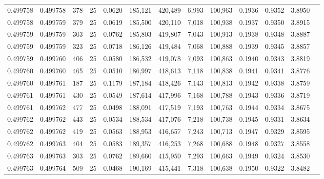 \begin{tabular}{rrrrrrrrrrrrr}
0.499758 & 0.499758 &   378 &  25 &                                     0.0620 & 185,121 & 420,489 &   6,993 & 100,963 & 0.1936 & 0.9352 & 3.8950 \\
0.499758 & 0.499759 &   379 &  25 &                                     0.0619 & 185,500 & 420,110 &   7,018 & 100,938 & 0.1937 & 0.9350 & 3.8915 \\
0.499759 & 0.499759 &   303 &  25 &                                     0.0762 & 185,803 & 419,807 &   7,043 & 100,913 & 0.1938 & 0.9348 & 3.8887 \\
0.499759 & 0.499759 &   323 &  25 &                                     0.0718 & 186,126 & 419,484 &   7,068 & 100,888 & 0.1939 & 0.9345 & 3.8857 \\
0.499759 & 0.499760 &   406 &  25 &                                     0.0580 & 186,532 & 419,078 &   7,093 & 100,863 & 0.1940 & 0.9343 & 3.8819 \\
0.499760 & 0.499760 &   465 &  25 &                                     0.0510 & 186,997 & 418,613 &   7,118 & 100,838 & 0.1941 & 0.9341 & 3.8776 \\
0.499760 & 0.499761 &   187 &  25 &                                     0.1179 & 187,184 & 418,426 &   7,143 & 100,813 & 0.1942 & 0.9338 & 3.8759 \\
0.499761 & 0.499761 &   430 &  25 &                                     0.0549 & 187,614 & 417,996 &   7,168 & 100,788 & 0.1943 & 0.9336 & 3.8719 \\
0.499761 & 0.499762 &   477 &  25 &                                     0.0498 & 188,091 & 417,519 &   7,193 & 100,763 & 0.1944 & 0.9334 & 3.8675 \\
0.499762 & 0.499762 &   443 &  25 &                                     0.0534 & 188,534 & 417,076 &   7,218 & 100,738 & 0.1945 & 0.9331 & 3.8634 \\
0.499762 & 0.499762 &   419 &  25 &                                     0.0563 & 188,953 & 416,657 &   7,243 & 100,713 & 0.1947 & 0.9329 & 3.8595 \\
0.499762 & 0.499763 &   404 &  25 &                                     0.0583 & 189,357 & 416,253 &   7,268 & 100,688 & 0.1948 & 0.9327 & 3.8558 \\
0.499763 & 0.499763 &   303 &  25 &                                     0.0762 & 189,660 & 415,950 &   7,293 & 100,663 & 0.1949 & 0.9324 & 3.8530 \\
0.499763 & 0.499764 &   509 &  25 &                                     0.0468 & 190,169 & 415,441 &   7,318 & 100,638 & 0.1950 & 0.9322 & 3.8482 \\

\end{tabular}

